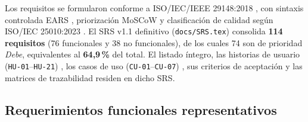 \documentclass[12pt,a4paper]{article}
\begin{document}
Los requisitos se formularon conforme a ISO/IEC/IEEE 29148:2018 \cite{iso-29148}, con sintaxis controlada EARS \cite{mavin-ears}, priorización MoSCoW \cite{clegg-moscow} y clasificación de calidad según ISO/IEC 25010:2023 \cite{iso-25010}. El SRS v1.1 definitivo (\texttt{docs/SRS.tex}) consolida \textbf{114 requisitos} (76 funcionales y 38 no funcionales), de los cuales 74 son de prioridad \textit{Debe}, equivalentes al \textbf{64,9\,\%} del total. El listado íntegro, las historias de usuario (\texttt{HU-01}--\texttt{HU-21}) \cite{cohn-stories}, los casos de uso (\texttt{CU-01}--\texttt{CU-07}) \cite{cockburn-uc}, sus criterios de aceptación \cite{north-bdd} y las matrices de trazabilidad residen en dicho SRS.

\subsection{Requerimientos funcionales representativos}
\end{document}
